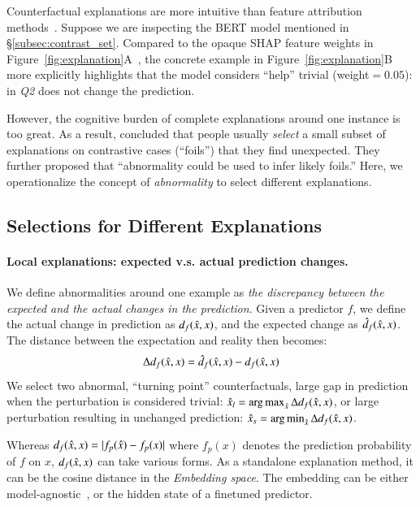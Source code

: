 Counterfactual explanations are more intuitive than feature attribution methods~\cite{miller}.
Suppose we are inspecting the \qqp BERT model mentioned in \S\ref{subsec:contrast_set}.
Compared to the opaque SHAP feature weights in Figure~\ref{fig:explanation}A~\cite{NIPS2017_7062}, the concrete example in Figure~\ref{fig:explanation}B more explicitly highlights that the model considers ``help'' trivial (weight$=0.05$): 
 in \emph{Q2} does not change the prediction.

However, the cognitive burden of complete explanations around one instance is too great.
As a result, \citet{miller} concluded that people usually \emph{select} a small subset of explanations on contrastive cases (``foils'') that they find unexpected. 
They further proposed that ``abnormality could be used to infer likely foils.''
Here, we operationalize the concept of \emph{abnormality} to select different explanations.


\subsection{Selections for Different Explanations}

\paragraph{Local explanations: expected v.s. actual prediction changes.}

We define abnormalities around one example as \emph{the discrepancy between the expected and the actual changes in the prediction}.
Given a predictor $f$, we define the actual change in prediction as $d_f(\hat{x}, x)$, and the expected change as $\hat{d}_f(\hat{x}, x)$.
The distance between the expectation and reality then becomes:
$$\Delta d_f(\hat{x}, x) = \hat{d}_f(\hat{x}, x)-d_f(\hat{x}, x)$$
We select two abnormal, ``turning point'' counterfactuals, \ie large gap in prediction when the perturbation is considered trivial: $\hat{x}_l = \operatorname*{arg\,max}_{\hat{x}} \Delta d_f(\hat{x}, x)$, or large perturbation resulting in unchanged prediction: $\hat{x}_s = \operatorname*{arg\,min}_{\hat{x}} \Delta d_f(\hat{x}, x)$.

Whereas $d_f(\hat{x}, x)=|f_p(\hat{x})-f_p(x)|$ where $f_p(x)$ denotes the prediction probability of $f$ on $x$, $d_f(\hat{x}, x)$ can take various forms. 
As a standalone explanation method, it can be the cosine distance in the \emph{Embedding space}.
The embedding can be either model-agnostic~\cite{reimers-2019-sentence-bert}, or the hidden state of a finetuned predictor.

